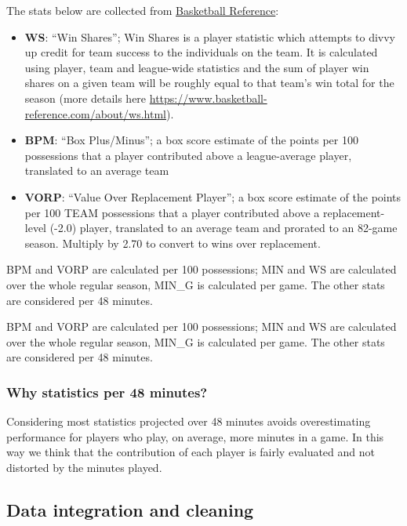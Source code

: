 \documentclass[
]{article}
\providecommand{\tightlist}{%
  \setlength{\itemsep}{0pt}\setlength{\parskip}{0pt}}
\begin{document}
The stats below are collected from
\href{https://www.basketball-reference.com}{Basketball Reference}:

\begin{itemize}
\tightlist
\item
  \textbf{WS}: ``Win Shares''; Win Shares is a player statistic which
  attempts to divvy up credit for team success to the individuals on the
  team. It is calculated using player, team and league-wide statistics
  and the sum of player win shares on a given team will be roughly equal
  to that team's win total for the season (more details here
  \url{https://www.basketball-reference.com/about/ws.html}).
\item
  \textbf{BPM}: ``Box Plus/Minus''; a box score estimate of the points
  per 100 possessions that a player contributed above a league-average
  player, translated to an average team
\item
  \textbf{VORP}: ``Value Over Replacement Player''; a box score estimate
  of the points per 100 TEAM possessions that a player contributed above
  a replacement-level (-2.0) player, translated to an average team and
  prorated to an 82-game season. Multiply by 2.70 to convert to wins
  over replacement.
\end{itemize}

BPM and VORP are calculated per 100 possessions; MIN and WS are
calculated over the whole regular season, MIN\_G is calculated per game.
The other stats are considered per 48 minutes.

BPM and VORP are calculated per 100 possessions; MIN and WS are
calculated over the whole regular season, MIN\_G is calculated per game.
The other stats are considered per 48 minutes.

\hypertarget{why-statistics-per-48-minutes}{%
\subsubsection{Why statistics per 48
minutes?}\label{why-statistics-per-48-minutes}}

Considering most statistics projected over 48 minutes avoids
overestimating performance for players who play, on average, more
minutes in a game. In this way we think that the contribution of each
player is fairly evaluated and not distorted by the minutes played.

\hypertarget{data-integration-and-cleaning}{%
\subsection{Data integration and
cleaning}\label{data-integration-and-cleaning}}
\end{document}
